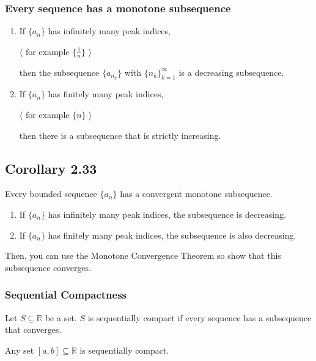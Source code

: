 \documentclass[12pt,letterpaper]{article}
\newcommand{\R}{{\mathbb R}}
\newcommand{\btw}[1]{
    $\langle$ #1 $\rangle$
}
\begin{document}
\begin{multicols*}{2}
        \subsubsection{Every sequence has a monotone subsequence}

        \begin{enumerate}
            \item If $\{a_n\}$ has infinitely many peak indices,

                \btw{for example $\{ \frac{1}{n} \}$}

                then the subsequence $\{a_{n_k}\}$ with $\{n_k\}_{k =
                1}^{\infty}$ is a decreasing subsequence.

            \item If $\{a_n\}$ has finitely many peak indices,

                \btw{ for example $\{n\}$}

                then there is a subsequence that is strictly increasing.
        \end{enumerate}

        \subsection{Corollary 2.33}
        Every bounded sequence $\{a_n\}$ has a convergent monotone subsequence.

        \begin{enumerate}
            \item If $\{a_n\}$ has infinitely many peak indices, the
                subsequence is decreasing.

            \item If $\{a_n\}$ has finitely many peak indices, the subsequence
                is also decreasing.
        \end{enumerate}

        Then, you can use the Monotone Convergence Theorem so show that this
        subsequence converges.

        \subsubsection{Sequential Compactness}

        Let $S \subseteq \R$ be a set. $S$ is sequentially compact if every
        sequence has a subsequence that converges.

        Any set $[a, b] \subseteq \R$ is sequentially compact.


\end{multicols*}
\end{document}
